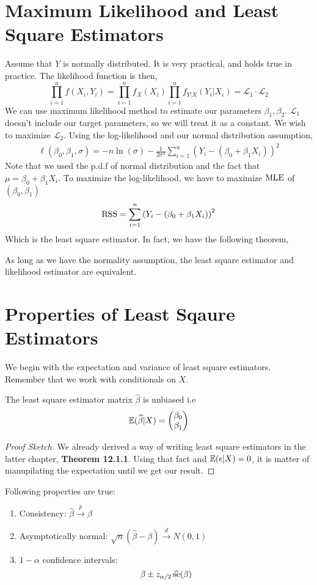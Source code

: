 \section{Maximum Likelihood and Least Square Estimators}
Assume that $Y$ is normally distributed. It is very practical, and holds true in practice. The likelihood function is then,
\[ \prod_{i=1}^nf(X_i, Y_i) = \prod_{i=1}^n f_X(X_i) \prod_{i=1}^n f_{Y|X}(Y_i | X_i) = \mathcal{L}_{1} \cdot \mathcal{L}_2\]
We can use maximum likelihood method to estimate our parameters $\beta_1, \beta_2$. $\mathcal{L}_1$ doesn't include our target parameters, so we will treat it as a constant. We wish to maximize $\mathcal{L}_2$. Using the log-likelihood and our normal distribution assumption,
\begin{align*}
    \ell(\beta_0, \beta_1, \sigma) = -n \ln(\sigma) - \frac{1}{2\sigma^2}\sum_{i=1}^n\left(Y_i - (\beta_0 + \beta_1 X_i)\right)^2
\end{align*}
Note that we used the p.d.f of normal distribution and the fact that $\mu = \beta_0 + \beta_1X_i$. To maximize the log-likelihood, we have to maximize $\operatorname{MLE}$ of $(\beta_0, \beta_1)$
\[\operatorname{RSS} = \sum_{i=1}^n\left(Y_i - (\beta_0 + \beta_1 X_i)\right)^2\]
Which is the least square estimator. In fact, we have the following theorem,
\begin{theorem}
    As long as we have the normality assumption, the least square estimator and likelihood estimator are equivalent.
\end{theorem}
\section{Properties of  Least Sqaure Estimators}
We begin with the expectation and variance of least square estimators. Remember that we work with conditionals on $X$.
\begin{theorem}
    The least square estimator matrix $\widehat{\beta}$ is unbiased i.e
    \[{\mathbb{E}}(\widehat{\beta} | X) = 
    \begin{pmatrix}
        \beta_0\\
        \beta_1
    \end{pmatrix}\]
    \begin{proof}[Proof Sketch]
        We already derived a way of writing least square estimators in the latter chapter, \textbf{Theorem 12.1.1}. Using that fact and ${\mathbb{E}}(\epsilon | X) = 0$, it is matter of manupilating the expectation until we get our result.
    \end{proof}
\end{theorem}
\begin{theorem}
    Following properties are true:
    \begin{enumerate}
        \item Consistency: $\widehat{\beta} \stackrel{p}{\longrightarrow} \beta$
        \item Asymptotically normal: $\sqrt{n}(\widehat{\beta} - \beta) \stackrel{d}{\longrightarrow} N(0, 1)$
        \item $1-\alpha$ confidence intervals:
            \[ \beta \pm z_{\alpha/2}\operatorname{\widehat{se}(\beta)}\]
    \end{enumerate}
\end{theorem}
